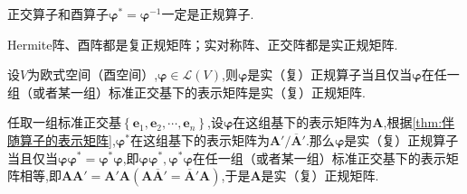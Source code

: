 \begin{brown}
    \begin{example}
        正交算子和酉算子$\bm{\varphi}^*=\bm{\varphi}^{-1}$一定是正规算子.
    \end{example}
\end{brown}
\begin{brown}
    \begin{example}
        \textup{Hermite}阵、酉阵都是复正规矩阵；实对称阵、正交阵都是实正规矩阵.
    \end{example}
\end{brown}
\begin{green}
    \begin{lemma}[正规算子与正规阵]\label{lem:正规算子与正规阵}
        设$V$为欧式空间（酉空间）,$\bm{\varphi}\in\mathcal{L}\left(V\right)$,则$\bm{\varphi}$是实（复）正规算子当且仅当$\bm{\varphi}$在任一组（或者某一组）标准正交基下的表示矩阵是实（复）正规矩阵.
    \end{lemma}
    \begin{Proof}
        任取一组标准正交基$\left\{
            \bm{e}_1,\bm{e}_2,\cdots,\bm{e}_n
            \right\}$,设$\bm{\varphi}$在这组基下的表示矩阵为$\bm{A}$,根据\cref{thm:伴随算子的表示矩阵},$\bm{\varphi}^*$在这组基下的表示矩阵为$\bm{A}'/\overline{\bm{A}}'$.那么$\bm{\varphi}$是实（复）正规算子当且仅当$\bm{\varphi\varphi}^*=\bm{\varphi}^*\bm{\varphi}$,即$\bm{\varphi\varphi}^*,\bm{\varphi}^*\bm{\varphi}$在任一组（或者某一组）标准正交基下的表示矩阵相等,即$\bm{AA}'=\bm{A}'\bm{A}\left(\bm{A}\overline{\bm{A}}'=
            \overline{\bm{A}}'\bm{A}
            \right)$,于是$\bm{A}$是实（复）正规矩阵.
    \end{Proof}
\end{green}
